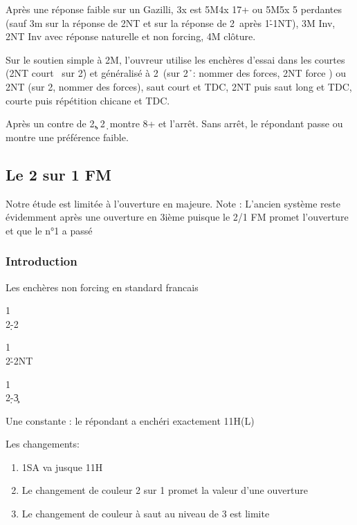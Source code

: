 \documentclass[a4paper]{article}
\begin{document}
Après une réponse faible sur un Gazilli, 3x est 5M4x 17+ ou 5M5x 5 perdantes (sauf 3m sur la réponse de 2NT et sur la réponse de 2\s\ après 1\h -1NT), 3M Inv, 2NT Inv avec réponse naturelle et non forcing, 4M clôture.

Sur le soutien simple à 2M, l'ouvreur utilise les enchères d'essai dans les courtes (2NT court \s\ sur 2\h ) et généralisé à 2\s\ (sur 2\h\ : nommer des forces, 2NT force \s ) ou 2NT (sur 2\s , nommer des forces), saut court et TDC, 2NT puis saut long et TDC, courte puis répétition chicane et TDC.

Après un contre de 2\c , 2\d\ montre 8+ et l'arrêt. Sans arrêt, le répondant passe ou montre une préférence faible.

\subsection{Le 2 sur 1 FM}

Notre étude est limitée à l’ouverture en majeure. 
Note : 
L’ancien système reste évidemment après une ouverture en 3ième puisque le 2/1 FM promet 
l’ouverture et que le n°1 a passé

\subsubsection{Introduction}

Les enchères non forcing en standard francais

\begin{bidtable}
1\c\\
2\d-2\s
\end{bidtable}

\begin{bidtable}
1\c\\
2\h-2NT
\end{bidtable}

\begin{bidtable}
1\c\\
2\d-3\c
\end{bidtable}

Une constante : le répondant a enchéri exactement 11H(L)

Les changements:

\begin{enumerate}
\item 1SA va jusque 11H

\item Le changement de couleur 2 sur 1 promet la valeur d’une ouverture

\item Le changement de couleur à saut au niveau de 3 est limite

\end{enumerate}
\end{document}
